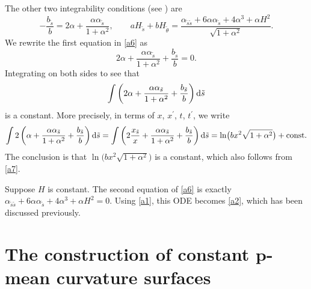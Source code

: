 \documentclass[pdftex]{sigma}
\numberwithin{equation}{section}
\begin{document}
The other two integrability conditions (see \cite[equation~(2.13)]{ChiuH/LiuH:2022}) are
\begin{equation} \label{a6}
-\frac{b_{\tilde s}}{b} = 2\alpha+\frac{\alpha \alpha_{\tilde s}}{1+\alpha^2
}, \qquad aH_{\tilde s}+bH_{\tilde \theta} =\frac{\alpha_{\tilde s\tilde s}+6\alpha
\alpha_{\tilde s}+4\alpha^3+\alpha H^2}{\sqrt{1+\alpha^2}}.
\end{equation}
We rewrite the first equation in \eqref{a6} as
\begin{equation*}
2\alpha+\frac{\alpha \alpha_{\tilde s}}{1+\alpha^2}+\frac{b_{\tilde s}}{b}=0.
\end{equation*}
Integrating on both sides to see that
\[
\int \left(2\alpha+\frac{\alpha \alpha_{\tilde s}}{1+\alpha^2}+\frac{b_{\tilde s}}{
b}\right){\rm d} \tilde s
\]
is a constant. More precisely, in terms of $x$, $x^{\prime }$, $t$, $t^{\prime }$, we
write
\begin{equation*}
\int 2\left(\alpha+\frac{\alpha \alpha_{\tilde s}}{1+\alpha^2}+\frac{b_{\tilde s}
}{b}\right){\rm d}\tilde s =\int \left(2\frac{x_{\tilde s}}{x}+\frac{\alpha \alpha_{\tilde s}}{1+\alpha^2}+
\frac{b_{\tilde s}}{b}\right){\rm d}\tilde s =\ln\bigl(bx^2\sqrt{1+\alpha^2}\bigr)+\text{\rm const}.
\end{equation*}
The conclusion is that $\ln\bigl(bx^2\sqrt{1+\alpha^2}\bigr)$ is a constant, which
also follows from \eqref{a7}.

Suppose $H$ is constant. The second equation of \eqref{a6} is exactly $
\alpha_{\tilde s\tilde s}+6\alpha \alpha_{\tilde s}+4\alpha^3+\alpha H^2=0$.
Using \eqref{a1}, this ODE becomes \eqref{a2}, which has been discussed
previously.

\section[The construction of constant p-mean curvature surfaces]{The construction of constant $\boldsymbol{ p}$-mean curvature surfaces}\label{ccpms}
\end{document}
